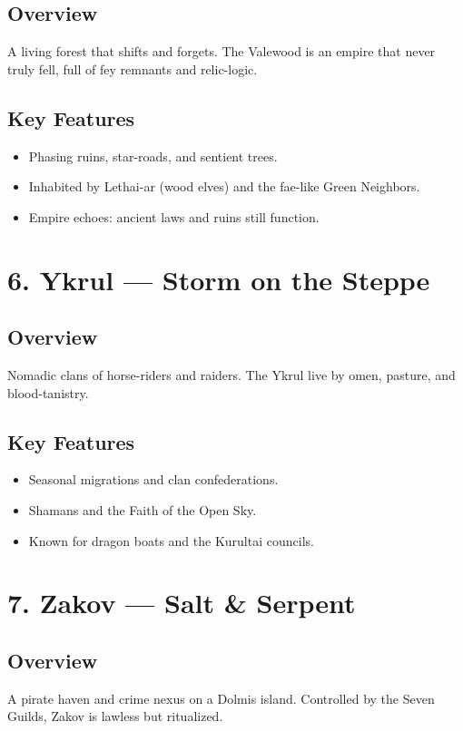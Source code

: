 \documentclass[11pt]{article}
\begin{document}
\subsection*{Overview}
A living forest that shifts and forgets. The Valewood is an empire that never truly fell, full of fey remnants and relic-logic.

\subsection*{Key Features}
\begin{itemize}[leftmargin=*]
    \item Phasing ruins, star-roads, and sentient trees.
    \item Inhabited by Lethai-ar (wood elves) and the fae-like Green Neighbors.
    \item Empire echoes: ancient laws and ruins still function.
\end{itemize}

\section*{6. Ykrul — Storm on the Steppe}

\subsection*{Overview}
Nomadic clans of horse-riders and raiders. The Ykrul live by omen, pasture, and blood-tanistry.

\subsection*{Key Features}
\begin{itemize}[leftmargin=*]
    \item Seasonal migrations and clan confederations.
    \item Shamans and the Faith of the Open Sky.
    \item Known for dragon boats and the Kurultai councils.
\end{itemize}

\section*{7. Zakov — Salt \& Serpent}

\subsection*{Overview}
A pirate haven and crime nexus on a Dolmis island. Controlled by the Seven Guilds, Zakov is lawless but ritualized.
\end{document}
